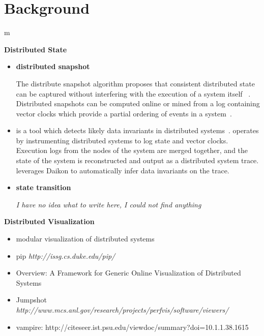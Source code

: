\section{Background}m
\label{sec:background}

\textbf{Distributed State}

\begin{itemize}
    \item \textbf{distributed snapshot}

The distribute snapshot algorithm proposes that consistent distributed state
can be captured without interfering with the execution of a system itself
~\cite{dist_snapshots_Chandy1985}. Distributed snapshots can be computed online
or mined from a log containing vector clocks which provide a partial ordering of events in a system~\cite{mattern_vector_clocks_1989}.

    \item \textbf{\dinv}

\dinv is a tool which detects likely data invariants in distributed
systems~\cite{dinv}. \dinv operates by instrumenting distributed systems to log
state and vector clocks. Execution logs from the nodes of the system are merged
together, and the state of the system is reconstructed and output as a
distributed system trace. \dinv leverages Daikon to automatically infer data
invariants on the trace.

    \item \textbf{state transition}

\textit{I have no idea what to write here, I could not find anything}

\end{itemize}


\textbf{Distributed Visualization}

\begin{itemize}

\item modular visualization of distributed systems

\item pip \textit{http://issg.cs.duke.edu/pip/}

\item Overview: A Framework for Generic Online Visualization of Distributed
Systems

\item Jumpshot \textit{http://www.mcs.anl.gov/research/projects/perfvis/software/viewers/}

\item vampire: http://citeseer.ist.psu.edu/viewdoc/summary?doi=10.1.1.38.1615

\end{itemize}
